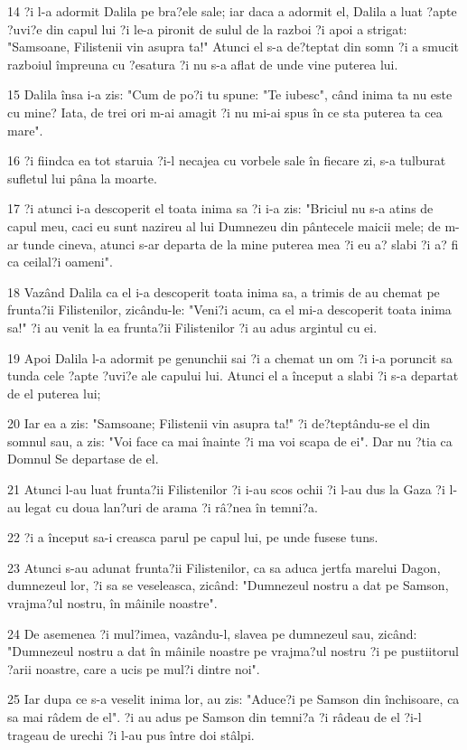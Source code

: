 \par 14 ?i l-a adormit Dalila pe bra?ele sale; iar daca a adormit el, Dalila a luat ?apte ?uvi?e din capul lui ?i le-a pironit de sulul de la razboi ?i apoi a strigat: "Samsoane, Filistenii vin asupra ta!" Atunci el s-a de?teptat din somn ?i a smucit razboiul împreuna cu ?esatura ?i nu s-a aflat de unde vine puterea lui.
\par 15 Dalila însa i-a zis: "Cum de po?i tu spune: "Te iubesc", când inima ta nu este cu mine? Iata, de trei ori m-ai amagit ?i nu mi-ai spus în ce sta puterea ta cea mare".
\par 16 ?i fiindca ea tot staruia ?i-l necajea cu vorbele sale în fiecare zi, s-a tulburat sufletul lui pâna la moarte.
\par 17 ?i atunci i-a descoperit el toata inima sa ?i i-a zis: "Briciul nu s-a atins de capul meu, caci eu sunt nazireu al lui Dumnezeu din pântecele maicii mele; de m-ar tunde cineva, atunci s-ar departa de la mine puterea mea ?i eu a? slabi ?i a? fi ca ceilal?i oameni".
\par 18 Vazând Dalila ca el i-a descoperit toata inima sa, a trimis de au chemat pe frunta?ii Filistenilor, zicându-le: "Veni?i acum, ca el mi-a descoperit toata inima sa!" ?i au venit la ea frunta?ii Filistenilor ?i au adus argintul cu ei.
\par 19 Apoi Dalila l-a adormit pe genunchii sai ?i a chemat un om ?i i-a poruncit sa tunda cele ?apte ?uvi?e ale capului lui. Atunci el a început a slabi ?i s-a departat de el puterea lui;
\par 20 Iar ea a zis: "Samsoane; Filistenii vin asupra ta!" ?i de?teptându-se el din somnul sau, a zis: "Voi face ca mai înainte ?i ma voi scapa de ei". Dar nu ?tia ca Domnul Se departase de el.
\par 21 Atunci l-au luat frunta?ii Filistenilor ?i i-au scos ochii ?i l-au dus la Gaza ?i l-au legat cu doua lan?uri de arama ?i râ?nea în temni?a.
\par 22 ?i a început sa-i creasca parul pe capul lui, pe unde fusese tuns.
\par 23 Atunci s-au adunat frunta?ii Filistenilor, ca sa aduca jertfa marelui Dagon, dumnezeul lor, ?i sa se veseleasca, zicând: "Dumnezeul nostru a dat pe Samson, vrajma?ul nostru, în mâinile noastre".
\par 24 De asemenea ?i mul?imea, vazându-l, slavea pe dumnezeul sau, zicând: "Dumnezeul nostru a dat în mâinile noastre pe vrajma?ul nostru ?i pe pustiitorul ?arii noastre, care a ucis pe mul?i dintre noi".
\par 25 Iar dupa ce s-a veselit inima lor, au zis: "Aduce?i pe Samson din închisoare, ca sa mai râdem de el". ?i au adus pe Samson din temni?a ?i râdeau de el ?i-l trageau de urechi ?i l-au pus între doi stâlpi.
